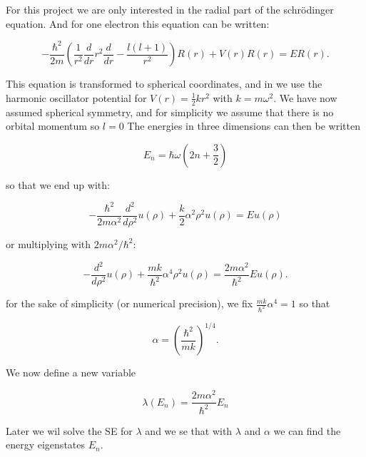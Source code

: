 \documentclass[norsk,a4paper,12pt]{article}
\begin{document}
For this project we are only interested in the radial part of the schrödinger equation.
And for one electron this equation can be written: 

\begin{equation}
 -\frac{\hbar^2}{2 m} \left ( \frac{1}{r^2} \frac{d}{dr} r^2
  \frac{d}{dr} - \frac{l (l + 1)}{r^2} \right )R(r) 
     + V(r) R(r) = E R(r).
\end{equation}

This equation is transformed to spherical coordinates, and in we use the harmonic oscillator potential for $V(r) = \frac{1}{2}kr^2$ with $k = m\omega^2$.
We have now assumed spherical symmetry, and for simplicity we assume that there is no orbital momentum so $l = 0$
The energies in three dimensions can then be written

\begin{equation}
 E_{n}=  \hbar \omega \left(2n+\frac{3}{2}\right)
\end{equation}

so that we end up with:

\begin{equation}
 -\frac{\hbar^2}{2 m \alpha^2} \frac{d^2}{d\rho^2} u(\rho) 
       + \frac{k}{2} \alpha^2\rho^2u(\rho)  = E u(\rho) 
\end{equation}

or multiplying with $2m\alpha^2/\hbar^2$:

\begin{equation}
 -\frac{d^2}{d\rho^2} u(\rho) 
       + \frac{mk}{\hbar^2} \alpha^4\rho^2u(\rho)  = \frac{2m\alpha^2}{\hbar^2}E u(\rho) .
\end{equation}

for the sake of simplicity (or numerical precision), we fix $\frac{mk}{\hbar^2}\alpha^4 = 1$ so that

\begin{equation}
 \alpha = \left(\frac{\hbar^2}{mk}\right)^{1/4}.
\end{equation}

We now define a new variable 

\begin{equation}
 \lambda(E_{n}) = \frac{2m\alpha^2}{\hbar^2}E_{n}
\end{equation}

Later we wil solve the SE for $\lambda$ and we se that with $\lambda$ and $\alpha$ we can find the energy eigenstates $E_{n}$.
\end{document}
